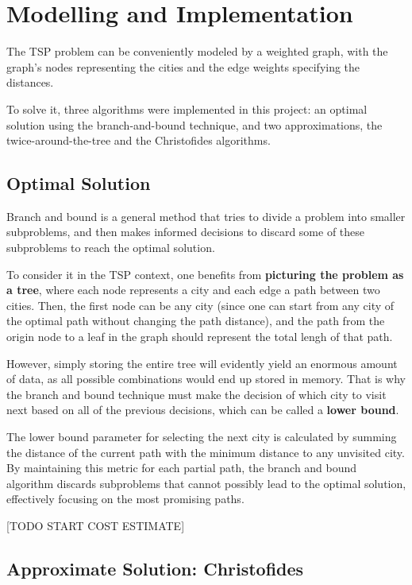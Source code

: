 \documentclass[12pt]{article}
\begin{document}
\section{Modelling and Implementation}

The TSP problem can be conveniently modeled by a weighted graph, with the graph's 
nodes representing the cities and the edge weights specifying the distances.

To solve it, three algorithms were implemented in this project: an optimal solution using 
the branch-and-bound technique, and two approximations, the twice-around-the-tree and the 
Christofides algorithms.

\subsection{Optimal Solution}

Branch and bound is a general method that tries to divide a problem into smaller subproblems,
and then makes informed decisions to discard some of these subproblems to reach the optimal solution.

To consider it in the TSP context, one benefits from \textbf{picturing the problem as a tree}, where each node 
represents a city and each edge a path between two cities. Then, the first node can be any city 
(since one can start from any city of the optimal path without changing the path distance), and 
the path from the origin node to a leaf in the graph should represent the total 
lengh of that path.

However, simply storing the entire tree will evidently yield an enormous amount 
of data, as all possible combinations would end up stored in memory. That is why the 
branch and bound technique must make the decision of which city to visit next based 
on all of the previous decisions, which can be called a \textbf{lower bound}.

The lower bound parameter for selecting the next city is calculated by summing the 
distance of the current path with the minimum distance to any unvisited city. By 
maintaining this metric for each partial path, the branch and bound algorithm 
discards subproblems that cannot possibly lead to the optimal solution, effectively 
focusing on the most promising paths.

[TODO START COST ESTIMATE]

\subsection{Approximate Solution: Christofides}
\end{document}
